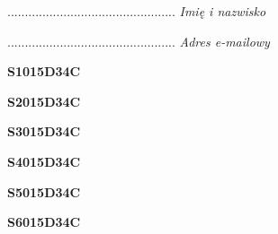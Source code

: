 \begin{turn}{90}\begin{minipage}{\linewidth} \vspace{20mm} ................................................  \textit{Imię i nazwisko}\end{minipage}\end{turn}

\begin{turn}{90}\begin{minipage}{\linewidth} \vspace{20mm} ................................................  \textit{Adres e-mailowy}\end{minipage}\end{turn}

\begin{turn}{90}\huge \begin{minipage}{\linewidth} \vspace{10mm}\textbf{S1015D34C}\end{minipage}\end{turn}

\begin{turn}{90}\huge \begin{minipage}{\linewidth} \vspace{10mm}\textbf{S2015D34C}\end{minipage}\end{turn}

\begin{turn}{90}\huge \begin{minipage}{\linewidth} \vspace{10mm}\textbf{S3015D34C}\end{minipage}\end{turn}

\begin{turn}{90}\huge \begin{minipage}{\linewidth} \vspace{10mm}\textbf{S4015D34C}\end{minipage}\end{turn}

\begin{turn}{90}\huge \begin{minipage}{\linewidth} \vspace{10mm}\textbf{S5015D34C}\end{minipage}\end{turn}

\begin{turn}{90}\huge \begin{minipage}{\linewidth} \vspace{10mm}\textbf{S6015D34C}\end{minipage}\end{turn}

